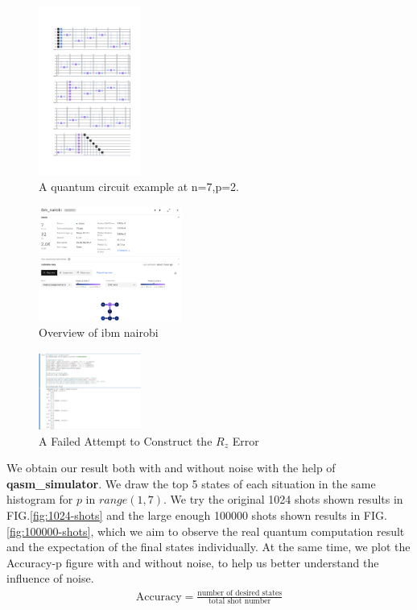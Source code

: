 \begin{figure}[!htb]
    \centering
    \includegraphics[width=0.3\textwidth]{circuit.png}
    \caption{A quantum circuit example at n=7,p=2.}
    \label{fig:expamle circuit}
\end{figure}

\begin{figure}[!htb]
    \centering
    \includegraphics[width=0.42\textwidth]{overview of ibm_nairobi.png}
    \caption{Overview of ibm nairobi}
    \label{fig:overview of ibm_nairobi}
\end{figure}

\begin{figure}[!htb]
    \centering
    \includegraphics[width=0.3\textwidth]{failure.jpg}
    \caption{A Failed Attempt to Construct the $R_z$ Error}
    \label{fig:failure}
\end{figure}

We obtain our result both with and without noise with the help of \textbf{qasm\_simulator}. We draw the top 5 states of each situation in the same histogram for $p$ in $range(1,7)$. We try the original 1024 shots shown results in FIG.\ref{fig:1024-shots} and the large enough 100000 shots  shown results in FIG.\ref{fig:100000-shots}, which we aim to observe the real quantum computation result and the expectation of the final states individually. At the same time, we plot the Accuracy-p figure with and without noise, to help us better understand the influence of noise. 
\begin{align*}
    \text{Accuracy}=\frac{\text{number of desired states}}{\text{total shot number}}
\end{align*}

